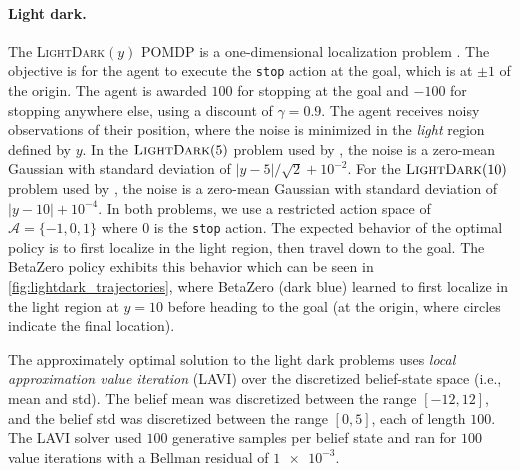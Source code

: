 \paragraph{Light dark.}
The \textsc{LightDark}$(y)$ POMDP is a one-dimensional localization problem \cite{platt2010belief}.
The objective is for the agent to execute the \texttt{stop} action at the goal, which is at $\pm 1$ of the origin.
The agent is awarded $100$ for stopping at the goal and $-100$ for stopping anywhere else, using a discount of $\gamma = 0.9$.
The agent receives noisy observations of their position, where the noise is minimized in the \textit{light} region defined by $y$.
In the $\textsc{LightDark}(5)$ problem used by \textcite{wu2021adaptive}, the noise is a zero-mean Gaussian with standard deviation of $|y - 5|/\sqrt{2} + 10^{-2}$.
For the $\textsc{LightDark}(10)$ problem used by \textcite{sunberg2018online}, the noise is a zero-mean Gaussian with standard deviation of $|y - 10| + 10^{-4}$.
In both problems, we use a restricted action space of $\mathcal{A} = \{-1, 0, 1\}$ where $0$ is the \texttt{stop} action.
The expected behavior of the optimal policy is to first localize in the light region, then travel down to the goal.
The BetaZero policy exhibits this behavior which can be seen in \cref{fig:lightdark_trajectories}, where BetaZero (dark blue) learned to first localize in the light region at $y=10$ before heading to the goal (at the origin, where circles indicate the final location).

The approximately optimal solution to the light dark problems uses \textit{local approximation value iteration} (LAVI) \cite{dmubook} over the discretized belief-state space (i.e., mean and std).
The belief mean was discretized between the range $[-12, 12]$, and the belief std was discretized between the range $[0, 5]$, each of length $100$.
The LAVI solver used $100$ generative samples per belief state and ran for $100$ value iterations with a Bellman residual of $\num{1e-3}$.


